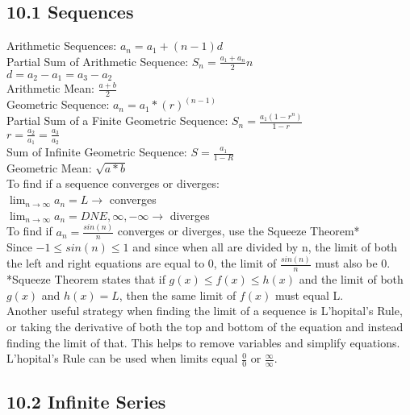 \documentclass{article}
\begin{document}
        \subsection*{10.1 Sequences}
            Arithmetic Sequences: $a_{n} = a_{1} + (n-1)d$ \\
            Partial Sum of Arithmetic Sequence: $S_{n} = \frac{a_{1} + a_{n}}{2} n$ \\
            $d = a_{2} - a_{1} = a_{3} - a_{2}$ \\
            Arithmetic Mean: $\frac{a+b}{2}$ \\
            Geometric Sequence: $a_{n} = a_{1} * (r)^(n-1) $ \\
            Partial Sum of a Finite Geometric Sequence: $S_{n} = \frac{a_{1}(1-r^n)}{1-r}$ \\ 
            $r = \frac{a_{2}}{a_{1}} = \frac{a_{3}}{a_{2}}$ \\
            Sum of Infinite Geometric Sequence: $S = \frac{a_{1}}{1-R}$ \\
            Geometric Mean: $\sqrt{a*b}$ \\
            To find if a sequence converges or diverges: \\
            $\lim_{n\to\infty} a_{n} = L \rightarrow$ converges \\
            $\lim_{n\to\infty} a_{n} = DNE, \infty, -\infty  \rightarrow$ diverges \\
            To find if $a_{n} = \frac{sin(n)}{n}$ converges or diverges, use the Squeeze Theorem* \\ 
            Since $-1 \leq sin(n) \leq 1$ and since when all are divided by n, the limit of both the left and right equations are equal to 0, the limit of $\frac{sin(n)}{n}$ must also be 0. \\
            *Squeeze Theorem states that if $g(x) \leq f(x) \leq h(x)$ and the limit of both $g(x)$ and $h(x) = L$, then the same limit of $f(x)$ must equal L. \\
            Another useful strategy when finding the limit of a sequence is L'hopital's Rule, or taking the derivative of both the top and bottom of the equation and instead finding the limit of that. This helps to remove variables and simplify equations. \\
            L'hopital's Rule can be used when limits equal $\frac{0}{0}$ or $\frac{\infty}{\infty}$. \\

        \color{Black}
        \subsection*{10.2 Infinite Series}
        \color{Brown}
\end{document}
